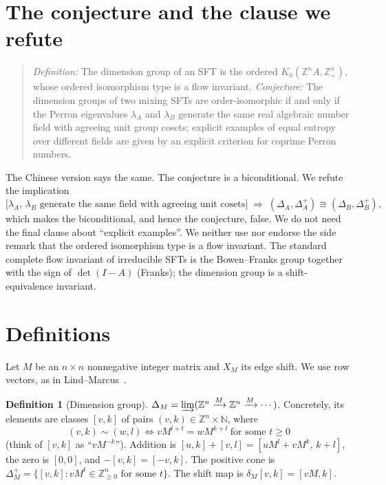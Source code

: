 \documentclass[11pt]{article}
\theoremstyle{definition}
\newtheorem{definition}[theorem]{Definition}
\theoremstyle{remark}
\newcommand{\Z}{\mathbb{Z}}
\newcommand{\N}{\mathbb{N}}
\begin{document}
\section{The conjecture and the clause we refute}
\begin{quote}
\emph{Definition:} The dimension group of an SFT is the ordered
$K_0(\Z^nA,\Z^n_+)$, whose ordered isomorphism type is a flow invariant.
\emph{Conjecture:} The dimension groups of two mixing SFTs are order-isomorphic if
and only if the Perron eigenvalues $\lambda_A$ and $\lambda_B$ generate the same
real algebraic number field with agreeing unit group cosets; explicit examples of
equal entropy over different fields are given by an explicit criterion for coprime
Perron numbers.
\end{quote}
The Chinese version says the same. The conjecture is a biconditional. We refute the
implication
\begin{equation}\label{eq:if}
\bigl[\text{$\lambda_A$, $\lambda_B$ generate the same field with agreeing unit cosets}\bigr]
\;\Longrightarrow\;(\Delta_A,\Delta_A^+)\cong(\Delta_B,\Delta_B^+),
\end{equation}
which makes the biconditional, and hence the conjecture, false. We do not need the
final clause about ``explicit examples''. We neither use nor endorse the side remark
that the ordered isomorphism type is a flow invariant. The standard complete flow
invariant of irreducible SFTs is the Bowen--Franks group together with the sign of
$\det(I-A)$ (Franks); the dimension group is a shift-equivalence invariant.

\section{Definitions}
Let $M$ be an $n\times n$ nonnegative integer matrix and $X_M$ its edge shift. We
use row vectors, as in Lind--Marcus~\cite{lm}.

\begin{definition}[Dimension group]\label{def:dg}
$\Delta_M=\varinjlim(\Z^n\xrightarrow{M}\Z^n\xrightarrow{M}\cdots)$. Concretely, its
elements are classes $[v,k]$ of pairs $(v,k)\in\Z^n\times\N$, where
\[
(v,k)\sim(w,l)\iff vM^{l+t}=wM^{k+t}\ \text{for some }t\ge0
\]
(think of $[v,k]$ as ``$vM^{-k}$''). Addition is
$[u,k]+[v,l]=[uM^l+vM^k,\,k+l]$, the zero is $[0,0]$, and $-[v,k]=[-v,k]$. The
positive cone is $\Delta_M^+=\{[v,k]: vM^t\in\Z^n_{\ge0}\text{ for some }t\}$.
The shift map is $\delta_M[v,k]=[vM,k]$.
\end{definition}
\end{document}
